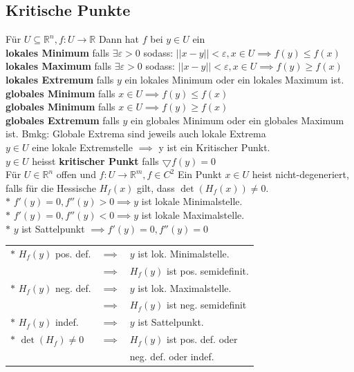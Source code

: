 \subsection{Kritische Punkte}
    Für $U\subseteq\mathbb R^n, f:U\rightarrow\mathbb R$ Dann hat $f$ bei $y\in U$ ein\\
    \textbf{lokales Minimum} falls $\exists\varepsilon>0$ sodass: $||x-y||<
    \varepsilon, x\in U\implies f(y)\leq f(x)$\\
    \textbf{lokales Maximum} falls $\exists\varepsilon>0$ sodass: $||x-y||<
    \varepsilon, x\in U\implies f(y)\geq f(x)$\\
    \textbf{lokales Extremum} falls $y$ ein lokales Minimum oder ein lokales
    Maximum ist.\\
    \textbf{globales Minimum} falls $x\in U\implies f(y)\leq f(x)$\\
    \textbf{globales Minimum} falls $x\in U\implies f(y)\geq f(x)$\\
    \textbf{globales Extremum} falls $y$ ein globales Minimum oder ein globales
    Maximum ist.
    Bmkg: Globale Extrema sind jeweils auch lokale Extrema\\
   $y\in U$ eine lokale Extremstelle $\implies$ y ist ein Kritischer Punkt.\\
   $y\in U$ heisst \textbf{kritischer Punkt} falls $\bigtriangledown f(y)=0$\\
    Für $U\in\mathbb R^n$ offen und $f:U\rightarrow\mathbb R^m,f\in C^2$
    Ein Punkt $x\in U$ heist nicht-degeneriert, falls für die Hessische $H_f(x)$
    gilt, dass $\det(H_f(x))\neq0$.\\
    $*$ $f'(y)=0,f''(y)>0\implies y$ ist lokale Minimalstelle.\\
    $*$ $f'(y)=0,f''(y)<0\implies y$ ist lokale Maximalstelle.\\
    $*$ $y$ ist Sattelpunkt $\implies f'(y)=0,f''(y)=0$\\
    \begin{tabular}{lll}
      $*$ $H_f(y)$ pos. def.  &$\implies$&$ y$ ist lok. Minimalstelle.\\
                              &$\implies$&$ H_f(y)$ ist pos. semidefinit.\\
      $*$ $H_f(y)$ neg. def.  &$\implies$&$ y$ ist lok. Maximalstelle.\\
                              &$\implies$&$ H_f(y)$ ist neg. semidefinit\\
      $*$ $H_f(y)$ indef.     &$\implies$&$ y$ ist Sattelpunkt.\\
      $*$ $\det(H_f)\neq0$ &$\implies$&$ H_f(y)$ ist pos. def. oder\\ &&neg. def.
      oder indef.
    \end{tabular}
